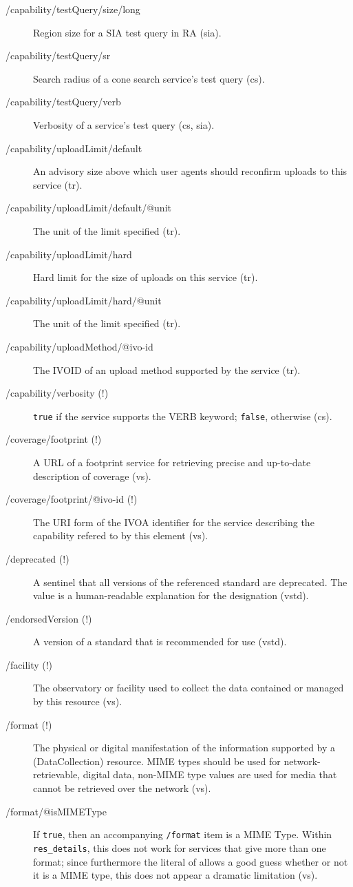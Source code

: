 \documentclass[11pt,a4paper]{ivoa}
\newcommand{\rtent}[1]{\texttt{\color{rtcolor} #1}}
\begin{document}
\begin{description}
\item[/capability/testQuery/size/long]Region size for a SIA test query in RA (sia).
\item[/capability/testQuery/sr]Search radius of a cone search service's test query (cs).
\item[/capability/testQuery/verb]Verbosity of a service's test query (cs, sia).
\item[/capability/uploadLimit/default]An advisory size above which user agents should reconfirm uploads to this service (tr).
\item[/capability/uploadLimit/default/@unit]The unit of the limit specified (tr).
\item[/capability/uploadLimit/hard]Hard limit for the size of uploads on this service (tr).
\item[/capability/uploadLimit/hard/@unit]The unit of the limit specified (tr).
\item[/capability/uploadMethod/@ivo-id]The IVOID of an upload method supported by the service (tr).
\item[/capability/verbosity (!)]\texttt{true} if the service supports the VERB keyword; \texttt{false}, otherwise (cs).
\item[/coverage/footprint (!)]A URL of a footprint service for retrieving precise and up-to-date description of coverage (vs).
\item[/coverage/footprint/@ivo-id (!)]The URI form of the IVOA identifier for the service describing the capability refered to by this element (vs).
\item[/deprecated (!)]A sentinel that all versions of the referenced standard are deprecated. The value is a human-readable explanation for the designation (vstd).
\item[/endorsedVersion (!)]A version of a standard that is recommended for use (vstd).
\item[/facility (!)]The observatory or facility used to collect the data contained or managed by this resource (vs).
\item[/format (!)]The physical or digital manifestation of the information supported by a (DataCollection) resource.  MIME types should be used for network-retrievable, digital data, non-MIME type values are used for media that cannot be retrieved over the network (vs).
\item[/format/@isMIMEType]If \texttt{true}, then an accompanying \texttt{/format} item is a MIME Type. Within \rtent{res\_details}, this does not work for services that give more than one format; since furthermore the literal of  allows a good guess whether or not it is a MIME type, this does not appear a dramatic limitation (vs).

\end{description}
\end{document}
